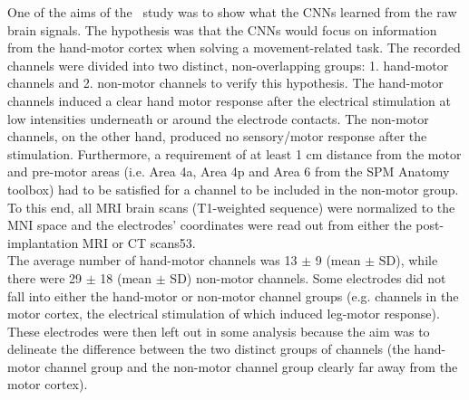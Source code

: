 One of the aims of the~\cite{Hammer-2021} study was to show what the CNNs learned from the raw brain signals.
The hypothesis was that the CNNs would focus on information from the hand-motor cortex when solving a movement-related task.
The recorded channels were divided into two distinct, non-overlapping groups: 1. hand-motor channels and 2. non-motor channels to verify this hypothesis.
The hand-motor channels induced a clear hand motor response after the electrical stimulation at low intensities underneath or around the electrode contacts.
The non-motor channels, on the other hand, produced no sensory/motor response after the stimulation.
Furthermore, a requirement of at least 1 cm distance from the motor and pre-motor areas (i.e. Area 4a, Area 4p and Area 6 from the SPM Anatomy toolbox\cite{eickhoff-new-2005}) had to be satisfied for a channel to be included in the non-motor group.
To this end, all MRI brain scans (T1-weighted sequence) were normalized to the MNI space and the electrodes' coordinates were read out from either the post-implantation MRI or CT scans53. \\

The average number of hand-motor channels was 13 $\pm$ 9 (mean $\pm$ SD), while there were 29 $\pm$ 18 (mean $\pm$ SD) non-motor channels.
Some electrodes did not fall into either the hand-motor or non-motor channel groups (e.g. channels in the motor cortex, the electrical stimulation of which induced leg-motor response).
These electrodes were then left out in some analysis because the aim was to delineate the difference between the two distinct groups of channels (the hand-motor channel group and the non-motor channel group clearly far away from the motor cortex).



